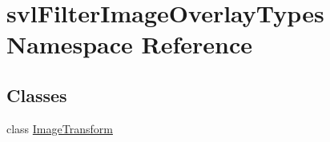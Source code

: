 \hypertarget{namespacesvl_filter_image_overlay_types}{\section{svl\-Filter\-Image\-Overlay\-Types Namespace Reference}
\label{namespacesvl_filter_image_overlay_types}
}
\subsection*{Classes}
\begin{DoxyCompactItemize}
\item 
class \hyperlink{classsvl_filter_image_overlay_types_1_1_image_transform}{Image\-Transform}
\end{DoxyCompactItemize}
